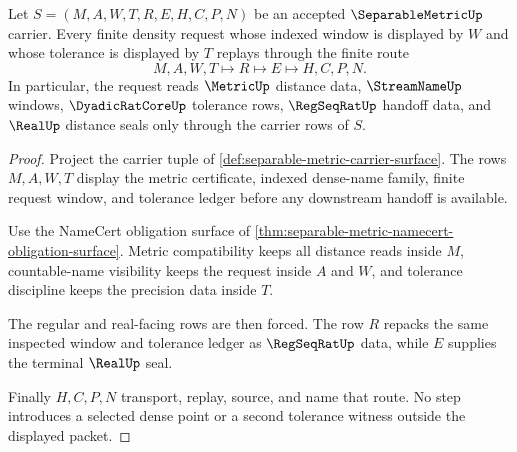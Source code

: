 \begin{theorem}
\label{thm:separable-metric-tolerance-net-replay}
Let $S=(M,A,W,T,R,E,H,C,P,N)$ be an accepted $\SeparableMetricUp$ carrier. Every finite density request whose indexed window is displayed by $W$ and whose tolerance is displayed by $T$ replays through the finite route
$$
M,A,W,T\longmapsto R\longmapsto E\longmapsto H,C,P,N .
$$
In particular, the request reads $\MetricUp$ distance data, $\StreamNameUp$ windows, $\DyadicRatCoreUp$ tolerance rows, $\RegSeqRatUp$ handoff data, and $\RealUp$ distance seals only through the carrier rows of $S$.
\end{theorem}
\begin{proof}
Project the carrier tuple of \autoref{def:separable-metric-carrier-surface}. The rows $M,A,W,T$ display the metric certificate, indexed dense-name family, finite request window, and tolerance ledger before any downstream handoff is available.

Use the NameCert obligation surface of \autoref{thm:separable-metric-namecert-obligation-surface}. Metric compatibility keeps all distance reads inside $M$, countable-name visibility keeps the request inside $A$ and $W$, and tolerance discipline keeps the precision data inside $T$.

The regular and real-facing rows are then forced. The row $R$ repacks the same inspected window and tolerance ledger as $\RegSeqRatUp$ data, while $E$ supplies the terminal $\RealUp$ seal.

Finally $H,C,P,N$ transport, replay, source, and name that route. No step introduces a selected dense point or a second tolerance witness outside the displayed packet.
\end{proof}

